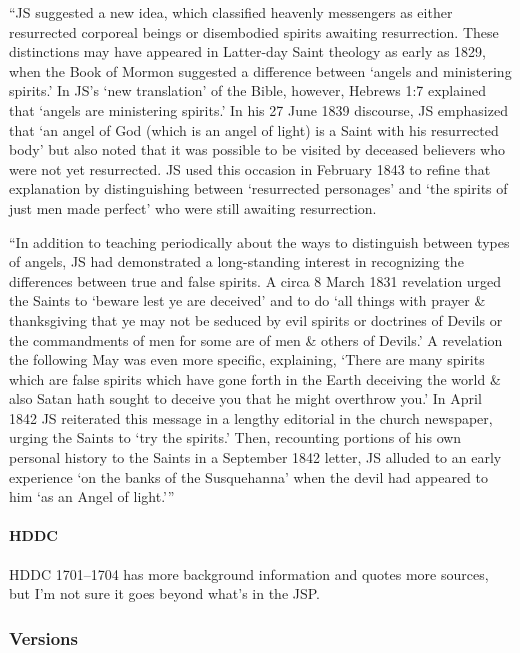 			``JS suggested a new idea, which classified heavenly messengers as either resurrected corporeal beings or disembodied spirits awaiting resurrection. These distinctions may have appeared in Latter-day Saint theology as early as 1829, when the Book of Mormon suggested a difference between `angels and ministering spirits.' In JS's `new translation' of the Bible, however, Hebrews 1:7 explained that `angels are ministering spirits.' In his 27 June 1839 discourse, JS emphasized that `an angel of God (which is an angel of light) is a Saint with his resurrected body' but also noted that it was possible to be visited by deceased believers who were not yet resurrected. JS used this occasion in February 1843 to refine that explanation by distinguishing between `resurrected personages' and `the spirits of just men made perfect' who were still awaiting resurrection. 

			``In addition to teaching periodically about the ways to distinguish between types of angels, JS had demonstrated a long-standing interest in recognizing the differences between true and false spirits. A circa 8 March 1831 revelation urged the Saints to `beware lest ye are deceived' and to do `all things with prayer \& thanksgiving that ye may not be seduced by evil spirits or doctrines of Devils or the commandments of men for some are of men \& others of Devils.' A revelation the following May was even more specific, explaining, `There are many spirits which are false spirits which have gone forth in the Earth deceiving the world \& also Satan hath sought to deceive you that he might overthrow you.' In April 1842 JS reiterated this message in a lengthy editorial in the church newspaper, urging the Saints to `try the spirits.' Then, recounting portions of his own personal history to the Saints in a September 1842 letter, JS alluded to an early experience `on the banks of the Susquehanna' when the devil had appeared to him `as an Angel of light.'''
			
		\paragraph{HDDC}
		
			HDDC 1701--1704 has more background information and quotes more sources, but I'm not sure it goes beyond what's in the JSP.
					
	\subsubsection{Versions}
		\label{DC129-V}
		
